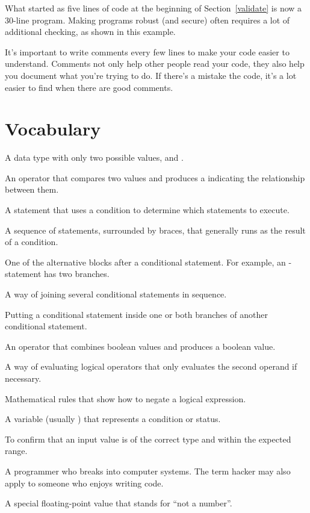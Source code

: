 What started as five lines of code at the beginning of Section~\ref{validate} is now a 30-line program.
Making programs robust (and secure) often requires a lot of additional checking, as shown in this example.


It's important to write comments every few lines to make your code easier to understand.
Comments not only help other people read your code, they also help you document what you're trying to do.
If there's a mistake the code, it's a lot easier to find when there are good comments.


\section{Vocabulary}

\begin{description}

A data type with only two possible values,  and .

An operator that compares two values and produces a  indicating the relationship between them.

A statement that uses a condition to determine which statements to execute.

A sequence of statements, surrounded by braces, that generally runs as the result of a condition.

One of the alternative blocks after a conditional statement.
For example, an - statement has two branches.

A way of joining several conditional statements in sequence.

Putting a conditional statement inside one or both branches of another conditional statement.

An operator that combines boolean values and produces a boolean value.

A way of evaluating logical operators that only evaluates the second operand if necessary.

Mathematical rules that show how to negate a logical expression.

A variable (usually ) that represents a condition or status.

To confirm that an input value is of the correct type and within the expected range.

A programmer who breaks into computer systems.
The term hacker may also apply to someone who enjoys writing code.

A special floating-point value that stands for ``not a number''.

\end{description}


